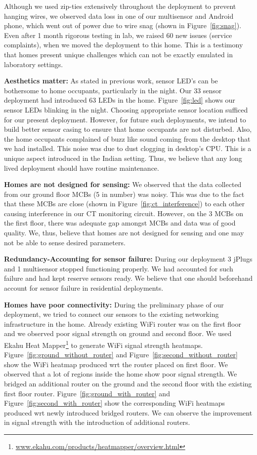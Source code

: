 \documentclass[10pt]{sensys-proc}
\newcommand{\figref}[1]{Figure~\ref{#1}}
\begin{document}
\noindent Although we used zip-ties extensively throughout the deployment to prevent hanging wires, we observed data loss in one of our multisensor and Android phone, which went out of power due to wire snag (shown in \figref{fig:snag}). Even after 1 month rigorous testing in lab, we raised 60 new issues (service complaints), when we moved the deployment to this home. This is a testimony that homes present unique challenges which can not be exactly emulated in laboratory settings.

\noindent \textbf{Aesthetics matter:} As stated in previous work, sensor LED's can be bothersome to home occupants, particularly in the night. Our 33 sensor deployment had introduced 63 LEDs in the home. \figref{fig:led} shows our sensor LEDs blinking in the night. Choosing appropriate sensor location sufficed for our present deployment. However, for future such deployments, we intend to build better sensor casing to ensure that home occupants are not disturbed. Also, the home occupants complained of buzz like sound coming from the desktop that we had installed. This noise was due to dust clogging in desktop's CPU. This is a unique aspect introduced in the Indian setting. Thus, we believe that any long lived deployment should have routine maintenance.

\noindent \textbf{Homes are not designed for sensing:} We observed that the data collected from our ground floor MCBs (5 in number) was noisy. This was due to the fact that these MCBs are close (shown in \figref{fig:ct_interference}) to each other causing interference in our CT monitoring circuit. However, on the 3 MCBs on the first floor, there was adequate gap amongst MCBs and data was of good quality. We, thus, believe that homes are not designed for sensing and one may not be able to sense desired parameters.

\noindent \textbf{Redundancy-Accounting for sensor failure:} During our deployment 3 jPlugs and 1 multisensor stopped functioning properly. We had accounted for such failure and had kept reserve sensors ready. We believe that one should beforehand account for sensor failure in residential deployments.

\noindent \textbf{Homes have poor connectivity:} During the preliminary phase of our deployment, we tried to connect our sensors to the existing networking infrastructure in the home. Already existing WiFi router was on the first floor and we observed poor signal strength on ground and second floor. We used Ekahu Heat Mapper\footnote{\url{www.ekahu.com/products/heatmapper/overview.html}} to generate WiFi signal strength heatmaps. \figref{fig:ground_without_router} and \figref{fig:second_without_router} show the WiFi heatmap produced wrt the router placed on first floor. We observed that a lot of regions inside the home show poor signal strength. We bridged an additional router on the ground and the second floor with the existing first floor router. \figref{fig:ground_with_router} and \figref{fig:second_with_router} show the corresponding WiFi heatmaps produced wrt newly introduced bridged routers. We can observe the improvement in signal strength with the introduction of additional routers. 
\end{document}
